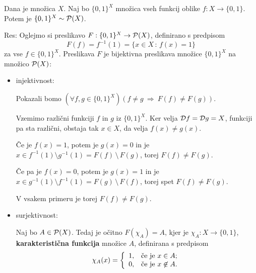 \documentclass[11pt,paper=b5,DIV=13,headinclude,footinclude]{scrbook}
\newcounter{example}
\def\sledi {{~\Rightarrow~}}
\def\brez {{\,\setminus\,}}
\begin{document}
\bigskip

\begin{example*}

Dana je množica $X$. Naj bo $\{0,1\}^X$ množica vseh funkcij oblike $f: X\to \{0,1\}$.
Potem je $\{0,1\}^X\sim {\cal P}(X)$.

Res:
Oglejmo si preslikavo
$F:\{0,1\}^X\to {\cal P}(X)$, definirano s predpisom
$$F(f) = f^{-1}(1) = \{x\in X\,:\,f(x) = 1\}$$
za vse $f\in \{0,1\}^X$.
Preslikava $F$ je bijektivna preslikava množice $\{0,1\}^X$ na množico ${\cal P}(X)$:
\begin{itemize}
  \item injektivnost:

Pokazali bomo $(\forall f,g\in \{0,1\}^X)(f\neq g\sledi F(f)\neq F(g))$.

Vzemimo različni funkciji $f$ in $g$ iz $\{0,1\}^X$. Ker velja ${\cal D}f = {\cal D}g = X$, funkciji pa sta različni,
obstaja tak $x\in X$, da velja $f(x) \neq g(x)$.

Če je $f(x) = 1$, potem je $g(x) = 0$ in je $x\in f^{-1}(1) \setminus g^{-1}(1) = F(f)\brez F(g)$, torej $F(f)\neq F(g)$.

Če pa je $f(x) = 0$, potem je $g(x) = 1$ in je $x\in g^{-1}(1) \setminus f^{-1}(1) = F(g)\brez F(f)$, torej spet $F(f)\neq F(g)$.

V vsakem primeru je torej $F(f) \neq F(g)$.

  \item surjektivnost:

  Naj bo $A\in {\cal P}(X)$. Tedaj je očitno $F(\chi_A) = A$, kjer je ${\chi_A}:X\to \{0,1\}$, \textbf{karakteristična funkcija}
  množice $A$, definirana s predpisom
  $$\chi_A(x) = \left\{
  \begin{array}{ll}
              1, & \hbox{če je $x\in A$;} \\
              0, & \hbox{če je $x\not\in A$.}
            \end{array}
          \right.$$
\end{itemize}
\end{example*}
\end{document}

